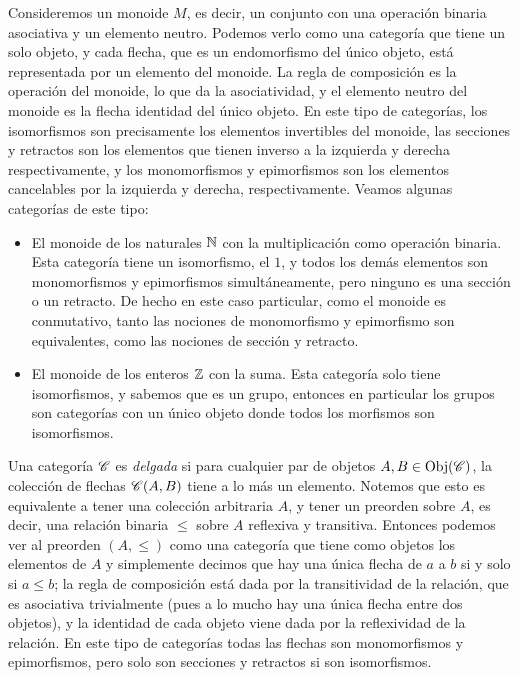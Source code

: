 \documentclass{comunicaciones}
\begin{document}
\begin{ej}[Monoides]
    Consideremos un monoide $M$, es decir, un conjunto con una operación binaria asociativa y un elemento neutro. 
    Podemos verlo como una categoría que tiene un solo objeto, y cada flecha, que es un endomorfismo del único objeto, está representada por un elemento
    del monoide. La regla de composición es la operación del monoide, lo que da la asociatividad, y el elemento neutro del monoide es la flecha identidad
    del único objeto. En este tipo de categorías, los isomorfismos son precisamente los elementos invertibles del monoide, las secciones y retractos son los
    elementos que tienen inverso a la izquierda y derecha respectivamente, y los monomorfismos y epimorfismos son los elementos cancelables por la izquierda
    y derecha, respectivamente. Veamos algunas categorías de este tipo:
    \begin{itemize}
        \item El monoide de los naturales $\mathbb N$ con la multiplicación como operación binaria. Esta categoría tiene un isomorfismo, el $1$, y todos
        los demás elementos son monomorfismos y epimorfismos simultáneamente, pero ninguno es una sección o un retracto. De hecho en este caso particular, como
        el monoide es conmutativo, tanto las nociones de monomorfismo y epimorfismo son equivalentes, como las nociones de sección y retracto.
        \item El monoide de los enteros $\mathbb Z$ con la suma. Esta categoría solo tiene isomorfismos, y sabemos que es un grupo, entonces en particular 
        los grupos son categorías con un único objeto donde todos los morfismos son isomorfismos.
    \end{itemize}
\end{ej}

\begin{ej}\label{categoria delgada}
    Una categoría $\mathscr C$ es \emph{delgada} si para cualquier par de objetos $A,B\in\mathrm{Obj}(\mathscr C)$, la colección de flechas $\mathscr C(A,B)$ tiene a lo más un elemento.
    Notemos que esto es equivalente a tener una colección arbitraria $A$, y tener un preorden sobre $A$, es decir, una relación binaria $\leq$ sobre $A$ 
    reflexiva y transitiva. Entonces podemos ver al preorden $(A,\leq)$ como una categoría que tiene como objetos los elementos de $A$ y simplemente decimos que hay
    una única flecha de $a$ a $b$ si y solo si $a\leq b$; la regla de composición está dada por la transitividad de la relación, que es asociativa trivialmente 
    (pues a lo mucho hay una única flecha entre dos objetos), y la identidad de cada objeto viene dada por la reflexividad de la relación. En este tipo de categorías
    todas las flechas son monomorfismos y epimorfismos, pero solo son secciones y retractos si son isomorfismos.
\end{ej}
\end{document}
